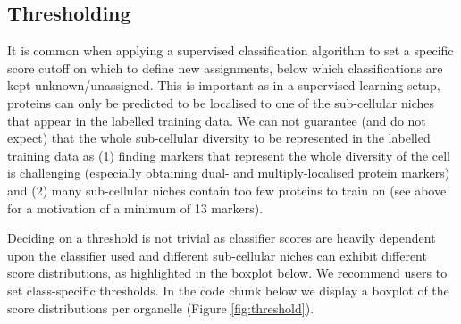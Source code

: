 \subsection*{Thresholding}\label{sec:thresholding}

It is common when applying a supervised classification algorithm to
set a specific score cutoff on which to define new assignments, below
which classifications are kept unknown/unassigned. This is important
as in a supervised learning setup, proteins can only be predicted to
be localised to one of the sub-cellular niches that appear in the
labelled training data. We can not guarantee (and do not expect) that
the whole sub-cellular diversity to be represented in the labelled
training data as (1) finding markers that represent the whole
diversity of the cell is challenging (especially obtaining dual- and
multiply-localised protein markers) and (2) many sub-cellular niches
contain too few proteins to train on (see above for a motivation of a
minimum of 13 markers).

Deciding on a threshold is not trivial as classifier scores are
heavily dependent upon the classifier used and different sub-cellular
niches can exhibit different score distributions, as highlighted in
the boxplot below. We recommend users to set class-specific
thresholds.  In the code chunk below we display a boxplot of the score
distributions per organelle (Figure \ref{fig:threshold}). 

